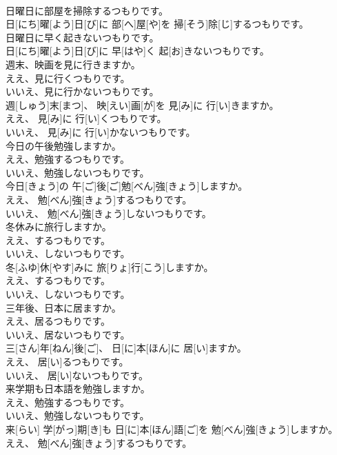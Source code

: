 \documentclass[8pt]{extreport}
\begin{document}
\begin{CJK}{UTF8}{min}
\\	日曜日に部屋を掃除するつもりです。	
\\	日[にち]曜[よう]日[び]に 部[へ]屋[や]を 掃[そう]除[じ]するつもりです。
\\	日曜日に早く起きないつもりです。	
\\	日[にち]曜[よう]日[び]に 早[はや]く 起[お]きないつもりです。
\\	週末、映画を見に行きますか。 
\\	ええ、見に行くつもりです。 
\\	いいえ、見に行かないつもりです。	
\\	週[しゅう]末[まつ]、 映[えい]画[が]を 見[み]に 行[い]きますか。 
\\	ええ、 見[み]に 行[い]くつもりです。 
\\	いいえ、 見[み]に 行[い]かないつもりです。
\\	今日の午後勉強しますか。 
\\	ええ、勉強するつもりです。 
\\	いいえ、勉強しないつもりです。	
\\	今日[きょう]の 午[ご]後[ご]勉[べん]強[きょう]しますか。 
\\	ええ、 勉[べん]強[きょう]するつもりです。 
\\	いいえ、 勉[べん]強[きょう]しないつもりです。
\\	冬休みに旅行しますか。 
\\	ええ、するつもりです。 
\\	いいえ、しないつもりです。	
\\	冬[ふゆ]休[やす]みに 旅[りょ]行[こう]しますか。 
\\	ええ、するつもりです。 
\\	いいえ、しないつもりです。
\\	三年後、日本に居ますか。 
\\	ええ、居るつもりです。 
\\	いいえ、居ないつもりです。	
\\	三[さん]年[ねん]後[ご]、 日[に]本[ほん]に 居[い]ますか。 
\\	ええ、 居[い]るつもりです。 
\\	いいえ、 居[い]ないつもりです。
\\	来学期も日本語を勉強しますか。 
\\	ええ、勉強するつもりです。 
\\	いいえ、勉強しないつもりです。	
\\	来[らい] 学[がっ]期[き]も 日[に]本[ほん]語[ご]を 勉[べん]強[きょう]しますか。 
\\	ええ、 勉[べん]強[きょう]するつもりです。 

\end{CJK}
\end{document}
